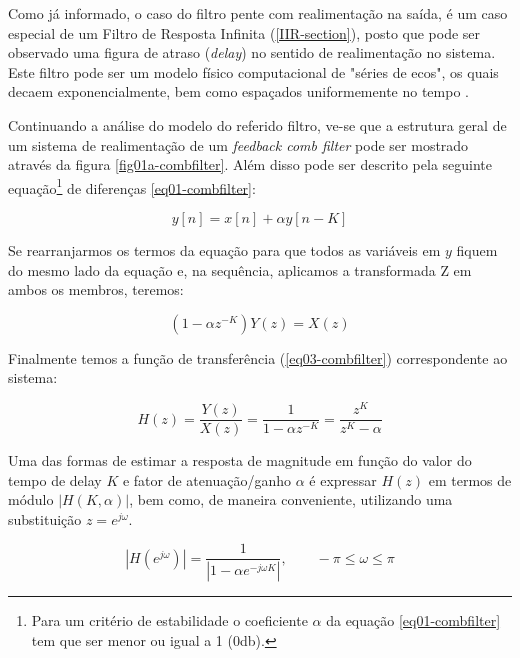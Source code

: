		Como já informado, o caso do filtro pente com realimentação na saída, é um caso especial de um Filtro de Resposta Infinita (\ref{IIR-section}), posto que pode ser observado uma figura de atraso (\textit{delay}) no sentido de realimentação no sistema. Este filtro pode ser um modelo físico computacional de "séries de ecos", os quais decaem exponencialmente, bem como espaçados uniformemente no tempo \cite{JuliusO.Smith2010}.
		
		
		Continuando a análise do modelo do referido filtro, ve-se que a estrutura geral de um sistema de realimentação de um \textit{ feedback comb filter} pode ser mostrado através da figura \ref{fig01a-combfilter}. Além disso pode ser descrito pela seguinte equação\footnote{Para um critério de estabilidade o coeficiente $\alpha$ da equação \ref{eq01-combfilter} tem que ser menor ou igual a 1 (0db).} de diferenças \ref{eq01-combfilter}:
				
		\begin{equation}
			\label{eq01-combfilter}
			y[n] = x[n] + \alpha y[n-K]
		\end{equation}
		
		Se rearranjarmos os termos da equação para que todos as variáveis em $y$ fiquem do mesmo lado da equação e, na sequência, aplicamos a transformada Z em ambos os membros, teremos:
		
		\begin{equation}
			\label{eq02-combfilter}
			(1-\alpha z^{-K})Y(z) = X(z)
		\end{equation}
		
		Finalmente temos a função de transferência (\ref{eq03-combfilter}) correspondente ao sistema:
		
		\begin{equation}
			\label{eq03-combfilter}
			H(z) = \frac{Y(z)}{X(z)} = \frac{1}{1-\alpha z^{-K}} = \frac{z^K}{z^K-\alpha}
		\end{equation}
		
		Uma das formas de estimar a resposta de magnitude em função do valor do tempo de delay $K$ e fator de atenuação/ganho $\alpha$ é expressar $ H(z) $ em termos de módulo $|H(K,\alpha)|$, bem como, de maneira conveniente, utilizando uma substituição $ z = e^{j\omega} $.
		
		\begin{equation}
			|H(e^{j\omega})| = \frac{1}{|1-\alpha e^{-j\omega K}|},
			\qquad
			-\pi\leq \omega \leq \pi
			\label{eq04-combfilter}
		\end{equation}
		
